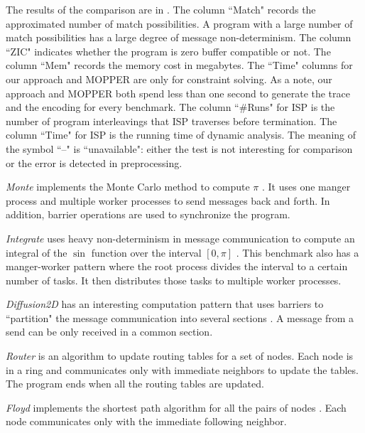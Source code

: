 The results of the comparison are in . The column ``Match" records the approximated number of match possibilities. A program with a large number of match possibilities has a large degree of message non-determinism. The column ``ZIC" indicates whether the program is zero buffer compatible or not. The column ``Mem" records the memory cost in megabytes. The ``Time" columns for our approach and MOPPER are only for constraint solving. As a note, our approach and MOPPER both spend less than one second to generate the trace and the encoding for every benchmark. The column ``\#Runs" for ISP is the number of program interleavings that ISP traverses before termination. The column ``Time" for ISP is the running time of dynamic analysis. The meaning of the symbol ``--" is ``unavailable": either the test is not interesting for comparison or the error is detected in preprocessing.
 

\textit{Monte} implements the Monte Carlo method to compute $\pi$ \cite{benchmark:mentoCarlo}. It uses one manger process and multiple worker processes to send messages back and forth. In addition, barrier operations are used to synchronize the program. 

\textit{Integrate} uses heavy non-determinism in message communication to compute an integral of the $\sin$ function over the interval $[0, \pi]$ \cite{benchmark:fevs}. This benchmark also has a manger-worker pattern where the root process divides the interval to a certain number of tasks. It then distributes those tasks to multiple worker processes.
 
\textit{Diffusion2D} has an interesting computation pattern that uses barriers to ``partition" the message communication into several sections \cite{benchmark:fevs}. A message from a send can be only received in a common section. 

\textit{Router} is an algorithm to update routing tables for a set of nodes. Each node is in a ring and communicates only with immediate neighbors to update the tables. The program ends when all the routing tables are updated. 

\textit{Floyd} implements the shortest path algorithm for all the pairs of nodes \cite{DBLP:conf/ppopp/XueLWGCZZV09}. Each node communicates only with the immediate following neighbor.

